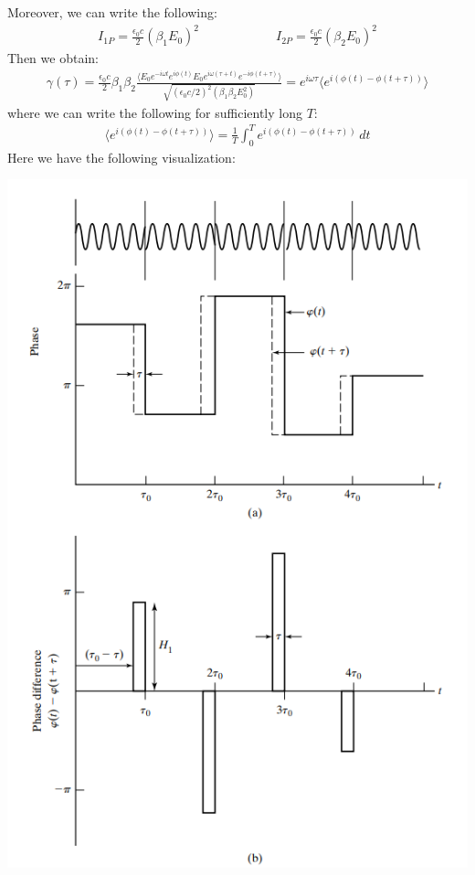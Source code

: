 \documentclass[11pt]{book}
\theoremstyle{break}
\theoremstyle{break}
\begin{document}
Moreover, we can write the following:
\begin{align*}
I_{1P} = \frac{\epsilon_0 c}{2}(\beta_1 E_0)^2 \qquad\qquad\qquad I_{2P} = \frac{\epsilon_0c}{2}(\beta_2 E_0)^2
\end{align*}
Then we obtain:
\begin{align*}
\gamma(\tau) = \frac{\epsilon_0 c}{2}\beta_1 \beta_2 \frac{\langle E_0 e^{-i\omega t}e^{i\phi(t)}E_0 e^{i\omega(\tau+t)} e^{-i\phi(t+\tau)}\rangle}{\sqrt{(\epsilon_0c/2)^2(\beta_1 \beta_2 E_0^2)}} = e^{i\omega \tau}\langle e^{i( \phi(t)-\phi(t+\tau))}\rangle
\end{align*}
where we can write the following for sufficiently long $T$:
\begin{align*}
\langle e^{i(\phi(t) - \phi(t+\tau))}\rangle = \frac{1}{T}\int_0^Te^{i(\phi(t) - \phi(t+\tau))}\, dt
\end{align*}
Here we have the following visualization:
\begin{center}
\includegraphics[scale=1]{timeCoh}
\end{center}
\end{document}

